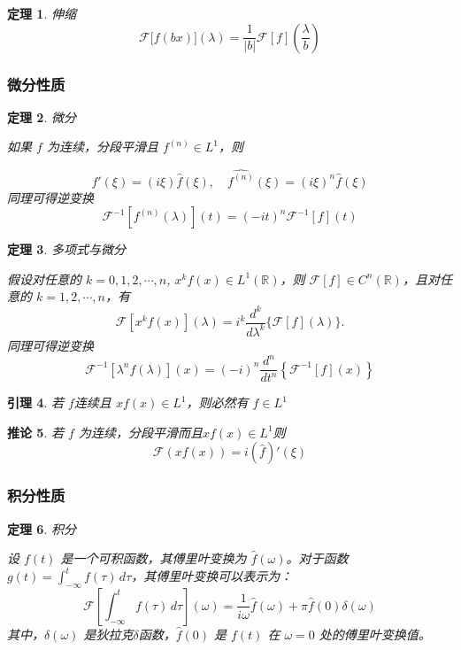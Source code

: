 \documentclass[12pt,a4paper]{article}
\theoremstyle{plain}
\newtheorem{theorem}{定理}[section]
\newtheorem{lemma}[theorem]{引理}
\newtheorem{corollary}[theorem]{推论}  %
\theoremstyle{definition}
\theoremstyle{remark}
\begin{document}
\begin{theorem}伸缩
	\[
\mathcal{F}\big[f(bx)\big](\lambda) = \frac{1}{|b|} \mathcal{F}[f]\left( \frac{\lambda}{b} \right)
\]
\end{theorem}

 \subsubsection{微分性质}
 \begin{theorem}微分
 	
 如果 \( f \) 为连续，分段平滑且 \( f^{(n)} \in L^1 \)，则
 
 \[
 \widehat{f'}(\xi) = (i\xi) \widehat{f}(\xi), \quad \widehat{f^{(n)}}(\xi) = (i\xi)^n \widehat{f}(\xi)
 \]
 同理可得逆变换
 \[
 \mathcal{F}^{-1}[f^{(n)}(\lambda)](t) = (-it)^n \mathcal{F}^{-1}[f](t)
 \]
\end{theorem}

\begin{theorem}多项式与微分
	
	假设对任意的 \( k = 0, 1, 2, \cdots, n \), \( x^k f(x) \in L^1(\mathbb{R}) \)，则 \( \mathcal{F}[f] \in C^n(\mathbb{R}) \)，且对任意的 \( k = 1, 2, \cdots, n \)，有
	\[
	\mathcal{F}\left[x^k f(x)\right](\lambda) = i^k \frac{d^k}{d\lambda^k} \{\mathcal{F}[f](\lambda)\}.
	\]
同理可得逆变换
\[
\mathcal{F}^{-1}[\lambda^n f(\lambda)](x) = (-i)^n \frac{d^n}{dt^n} \left\{ \mathcal{F}^{-1}[f](x) \right\}
\]
\end{theorem}

\begin{lemma}
若 \( f \)连续且 \( xf(x) \in L^1 \)，则必然有 \( f \in L^1 \)

\end{lemma}

\begin{corollary}
若 \( f \) 为连续，分段平滑而且\( xf(x)  \in L^1\)则
\[
\mathcal{F}(xf(x)) = i (\widehat{f})'(\xi)
\]
  \end{corollary}







 \subsubsection{积分性质}
 \begin{theorem}积分
 	
 设 \( f(t) \) 是一个可积函数，其傅里叶变换为 \( \hat{f}(\omega) \)。对于函数 \( g(t) = \int_{-\infty}^{t} f(\tau) \, d\tau \)，其傅里叶变换可以表示为：
 \[
 \mathcal{F}\left[\int_{-\infty}^{t} f(\tau) \, d\tau\right](\omega) = \frac{1}{i\omega} \hat{f}(\omega) + \pi \hat{f}(0) \delta(\omega)
 \]
 其中，\( \delta(\omega) \) 是狄拉克$\delta$函数，\( \hat{f}(0) \) 是 \( f(t) \) 在 \( \omega = 0 \) 处的傅里叶变换值。
 \end{theorem}
 
\end{document}
